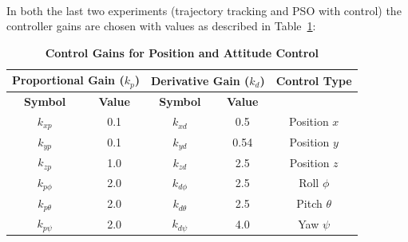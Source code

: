 \documentclass[main]{subfiles}
\begin{document}
\noindent\\
In both the last two experiments (trajectory tracking and PSO with
control) the controller gains are chosen with values as
described in Table~\ref{tab:control_gains}:
\begin{table}[H]
\centering
\caption{\textbf{Control Gains for Position and Attitude Control}}
\begin{tabular}{c c | c c | c}
\hline\hline
\multicolumn{2}{c|}{\textbf{Proportional Gain (\(k_p\))}} & \multicolumn{2}{c|}{\textbf{Derivative Gain (\(k_d\))}} & \textbf{Control Type} \\ \hline
\textbf{Symbol}       & \textbf{Value}       & \textbf{Symbol}       & \textbf{Value}       &                      \\ \hline\hline
\(k_{xp}\)           & 0.1                 & \(k_{xd}\)           & 0.5                 & Position \(x\)       \\
\(k_{yp}\)           & 0.1                 & \(k_{yd}\)           & 0.54                & Position \(y\)       \\
\(k_{zp}\)           & 1.0                 & \(k_{zd}\)           & 2.5                 & Position \(z\)       \\ \hline
\(k_{p\phi}\)        & 2.0                 & \(k_{d\phi}\)       & 2.5                 & Roll \(\phi\)        \\
\(k_{p\theta}\)      & 2.0                 & \(k_{d\theta}\)     & 2.5                 & Pitch \(\theta\)     \\
\(k_{p\psi}\)        & 2.0                 & \(k_{d\psi}\)       & 4.0                 & Yaw \(\psi\)         \\
\hline\hline
\end{tabular}
\label{tab:control_gains}
\end{table}
    
\end{document}
